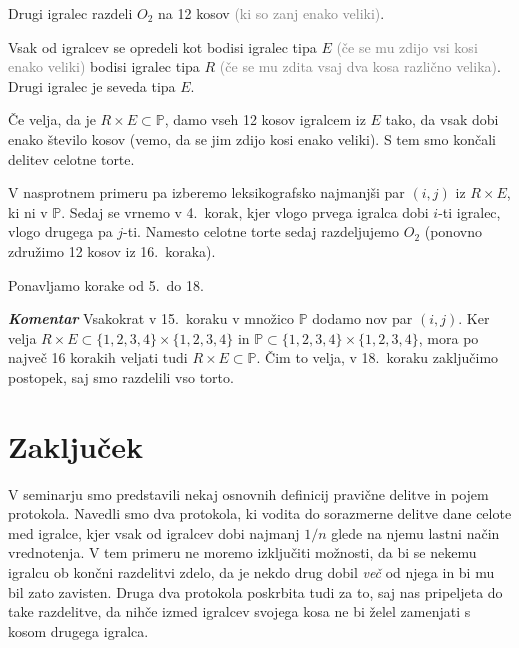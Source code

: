 \documentclass[a4paper,12pt]{article}
\def\P{\mathbb{P}}
\begin{document}
\begin{protokol}
\item Drugi igralec razdeli $O_2$ na 12 kosov \textcolor{gray}{(ki so zanj enako veliki)}.

\item Vsak od igralcev se opredeli kot bodisi igralec tipa $E$ \textcolor{gray}{(če se mu zdijo vsi kosi enako veliki)} bodisi igralec tipa $R$ \textcolor{gray}{(če se mu zdita vsaj dva kosa različno velika)}. Drugi igralec je seveda tipa $E$.

\item Če velja, da je  $R \times E \subset \P$, damo vseh 12 kosov igralcem iz $E$ tako, da vsak dobi enako število kosov (vemo, da se jim zdijo kosi enako veliki). S tem smo končali delitev celotne torte.

\item V nasprotnem primeru pa izberemo leksikografsko najmanjši par $(i, j)$ iz $R \times E$, ki ni v $\P$. Sedaj se vrnemo v 4.~korak, kjer vlogo prvega igralca dobi $i$-ti igralec, vlogo drugega pa $j$-ti. Namesto celotne torte sedaj razdeljujemo $O_2$ (ponovno združimo 12 kosov iz 16.~koraka).

\item Ponavljamo korake od 5.~do 18.

 \item [\textbf{\em Komentar}] Vsakokrat v 15.~koraku v množico $\P$ dodamo nov par $(i, j)$. Ker velja $R \times E \subset {\{1, 2, 3, 4\}} \times {\{1, 2, 3, 4\}}$ in $\P \subset {\{1, 2, 3, 4\}} \times {\{1, 2, 3, 4\}}$, mora po največ 16 korakih veljati tudi $R \times E \subset \P$. Čim to velja, v 18.~koraku zaključimo postopek, saj smo razdelili vso torto.
 
 \end{protokol}
 
 \section{Zaključek}
 
 V seminarju smo predstavili nekaj osnovnih definicij pravične delitve in pojem protokola. Navedli smo dva protokola, ki vodita do sorazmerne delitve dane celote med igralce, kjer vsak od igralcev dobi najmanj $1/n$ glede na njemu lastni način vrednotenja. V tem primeru ne moremo izključiti možnosti, da bi se nekemu igralcu ob končni razdelitvi zdelo, da je nekdo drug dobil {\em več} od njega in bi mu bil zato zavisten. Druga dva protokola poskrbita tudi za to, saj nas pripeljeta do take razdelitve, da nihče izmed igralcev svojega kosa ne bi želel zamenjati s kosom drugega igralca.
 
\end{document}
